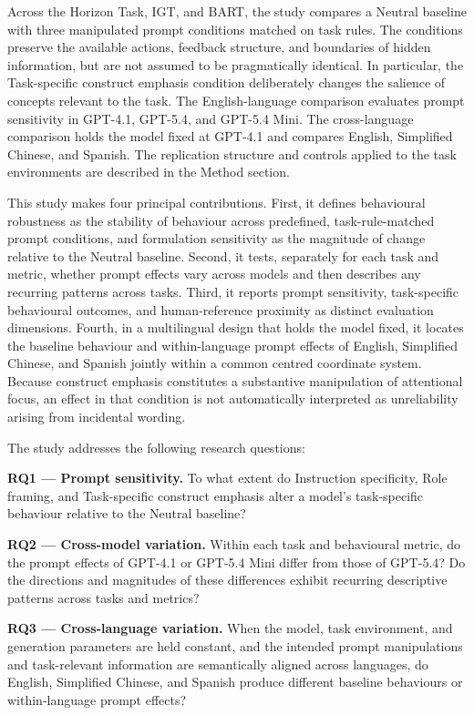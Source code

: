 Across the Horizon Task, IGT, and BART, the study compares a Neutral baseline with three manipulated prompt conditions matched on task rules. The conditions preserve the available actions, feedback structure, and boundaries of hidden information, but are not assumed to be pragmatically identical. In particular, the Task-specific construct emphasis condition deliberately changes the salience of concepts relevant to the task. The English-language comparison evaluates prompt sensitivity in GPT-4.1, GPT-5.4, and GPT-5.4 Mini. The cross-language comparison holds the model fixed at GPT-4.1 and compares English, Simplified Chinese, and Spanish. The replication structure and controls applied to the task environments are described in the Method section.

This study makes four principal contributions. First, it defines behavioural robustness as the stability of behaviour across predefined, task-rule-matched prompt conditions, and formulation sensitivity as the magnitude of change relative to the Neutral baseline. Second, it tests, separately for each task and metric, whether prompt effects vary across models and then describes any recurring patterns across tasks. Third, it reports prompt sensitivity, task-specific behavioural outcomes, and human-reference proximity as distinct evaluation dimensions. Fourth, in a multilingual design that holds the model fixed, it locates the baseline behaviour and within-language prompt effects of English, Simplified Chinese, and Spanish jointly within a common centred coordinate system. Because construct emphasis constitutes a substantive manipulation of attentional focus, an effect in that condition is not automatically interpreted as unreliability arising from incidental wording.

The study addresses the following research questions:

\noindent\textbf{RQ1 --- Prompt sensitivity.}
To what extent do Instruction specificity, Role framing, and Task-specific construct emphasis alter a model's task-specific behaviour relative to the Neutral baseline?

\noindent\textbf{RQ2 --- Cross-model variation.}
Within each task and behavioural metric, do the prompt effects of GPT-4.1 or GPT-5.4 Mini differ from those of GPT-5.4? Do the directions and magnitudes of these differences exhibit recurring descriptive patterns across tasks and metrics?

\noindent\textbf{RQ3 --- Cross-language variation.}
When the model, task environment, and generation parameters are held constant, and the intended prompt manipulations and task-relevant information are semantically aligned across languages, do English, Simplified Chinese, and Spanish produce different baseline behaviours or within-language prompt effects?

